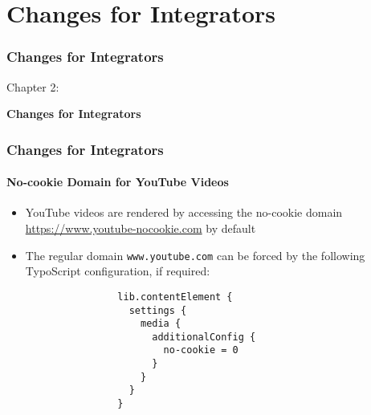 %

\section{Changes for Integrators}
\begin{frame}[fragile]
	\frametitle{Changes for Integrators}

	\begin{center}\huge{Chapter 2:}\end{center}
	\begin{center}\huge{\color{typo3darkgrey}\textbf{Changes for Integrators}}\end{center}

\end{frame}


\begin{frame}[fragile]
	\frametitle{Changes for Integrators}
	\framesubtitle{No-cookie Domain for YouTube Videos}

	\lstset{basicstyle=\smaller\ttfamily}

	\begin{itemize}
		\item YouTube videos are rendered by accessing the no-cookie domain
			\url{https://www.youtube-nocookie.com} by default
		\item The regular domain \texttt{www.youtube.com} can be forced by
			the following TypoScript configuration, if required:

			\begin{lstlisting}
				lib.contentElement {
				  settings {
				    media {
				      additionalConfig {
				        no-cookie = 0
				      }
				    }
				  }
				}
			\end{lstlisting}

	\end{itemize}

\end{frame}

